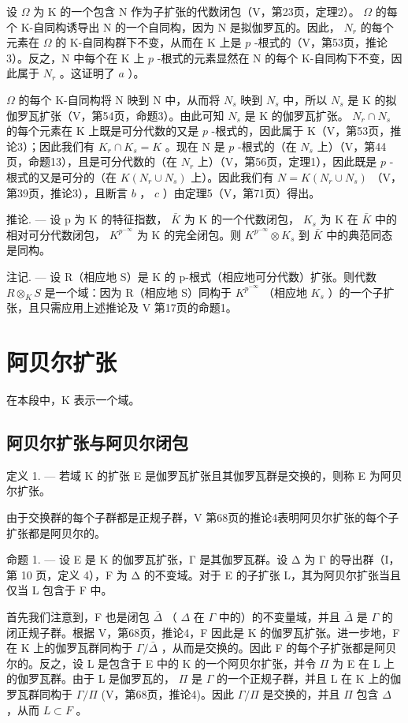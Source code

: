 设 \(\Omega\) 为 K 的一个包含 N 作为子扩张的代数闭包（V，第23页，定理2）。 \(\Omega\) 的每个 K-自同构诱导出 N 的一个自同构，因为 N 是拟伽罗瓦的。因此， \(N_r\) 的每个元素在 \(\Omega\) 的 K-自同构群下不变，从而在 K 上是 \(p\) -根式的（V，第53页，推论3）。反之，N 中每个在 K 上 \(p\) -根式的元素显然在 N 的每个 K-自同构下不变，因此属于 \(N_r\) 。这证明了 \(a\) ）。

 \(\Omega\) 的每个 K-自同构将 N 映到 N 中，从而将 \(N_s\) 映到 \(N_s\) 中，所以 \(N_s\) 是 K 的拟伽罗瓦扩张（V，第54页，命题3）。由此可知 \(N_s\) 是 K 的伽罗瓦扩张。 \(N_r \cap N_s\) 的每个元素在 K 上既是可分代数的又是 \(p\) -根式的，因此属于 K（V，第53页，推论3）；因此我们有 \(K_r \cap K_s = K\) 。现在 N 是 \(p\) -根式的（在 \(N_s\) 上）（V，第44页，命题13），且是可分代数的（在 \(N_r\) 上）（V，第56页，定理1），因此既是 \(p\) -根式的又是可分的（在 \(K(N_r \cup N_s)\) 上）。因此我们有 \(N = K(N_r \cup N_s)\) （V，第39页，推论3），且断言 \(b\) ， \(c\) ）由定理5（V，第71页）得出。

推论. --- 设 p 为 K 的特征指数， \(\bar{K}\) 为 K 的一个代数闭包， \(K_{s}\) 为 K 在 \(\bar{K}\) 中的相对可分代数闭包， \(K^{p^{-\infty}}\) 为 K 的完全闭包。则 \(K^{p^{-\infty}} \otimes K_{s}\) 到 \(\bar{K}\) 中的典范同态是同构。

注记. --- 设 R（相应地 S）是 K 的 p-根式（相应地可分代数）扩张。则代数 \(R \otimes_{K} S\) 是一个域：因为 R（相应地 S）同构于 \(K^{p^{-\infty}}\) （相应地 \(K_{s}\) ）的一个子扩张，且只需应用上述推论及 V 第17页的命题1。

\section{阿贝尔扩张}

在本段中，K 表示一个域。

\subsection{阿贝尔扩张与阿贝尔闭包}

定义 1. --- 若域 K 的扩张 E 是伽罗瓦扩张且其伽罗瓦群是交换的，则称 E 为阿贝尔扩张。

由于交换群的每个子群都是正规子群，V 第68页的推论4表明阿贝尔扩张的每个子扩张都是阿贝尔的。

命题 1. --- 设 E 是 K 的伽罗瓦扩张，Γ 是其伽罗瓦群。设 Δ 为 Γ 的导出群（I，第 10 页，定义 4），F 为 Δ 的不变域。对于 E 的子扩张 L，其为阿贝尔扩张当且仅当 L 包含于 F 中。

首先我们注意到，F 也是闭包 \(\bar{\Delta}\) （ \(\Delta\) 在 \(\Gamma\) 中的）的不变量域，并且 \(\bar{\Delta}\) 是 \(\Gamma\) 的闭正规子群。根据 V，第68页，推论4，F 因此是 K 的伽罗瓦扩张。进一步地，F 在 K 上的伽罗瓦群同构于 \(\Gamma/\bar{\Delta}\) ，从而是交换的。因此 F 的每个子扩张都是阿贝尔的。反之，设 L 是包含于 E 中的 K 的一个阿贝尔扩张，并令 \(\Pi\) 为 E 在 L 上的伽罗瓦群。由于 L 是伽罗瓦的， \(\Pi\) 是 \(\Gamma\) 的一个正规子群，并且 L 在 K 上的伽罗瓦群同构于 \(\Gamma/\Pi\) (V，第68页，推论4)。因此 \(\Gamma/\Pi\) 是交换的，并且 \(\Pi\) 包含 \(\Delta\) ，从而 \(L \subset F\) 。

